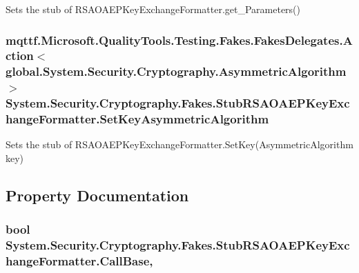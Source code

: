 Sets the stub of R\-S\-A\-O\-A\-E\-P\-Key\-Exchange\-Formatter.\-get\-\_\-\-Parameters()

\hypertarget{class_system_1_1_security_1_1_cryptography_1_1_fakes_1_1_stub_r_s_a_o_a_e_p_key_exchange_formatter_a483d5a9bc9c3feb38e75a051628524e9}{
\subsubsection[{Set\-Key\-Asymmetric\-Algorithm}]{\setlength{\rightskip}{0pt plus 5cm}mqttf.\-Microsoft.\-Quality\-Tools.\-Testing.\-Fakes.\-Fakes\-Delegates.\-Action$<$global.\-System.\-Security.\-Cryptography.\-Asymmetric\-Algorithm$>$ System.\-Security.\-Cryptography.\-Fakes.\-Stub\-R\-S\-A\-O\-A\-E\-P\-Key\-Exchange\-Formatter.\-Set\-Key\-Asymmetric\-Algorithm}}\label{class_system_1_1_security_1_1_cryptography_1_1_fakes_1_1_stub_r_s_a_o_a_e_p_key_exchange_formatter_a483d5a9bc9c3feb38e75a051628524e9}


Sets the stub of R\-S\-A\-O\-A\-E\-P\-Key\-Exchange\-Formatter.\-Set\-Key(\-Asymmetric\-Algorithm key)



\subsection{Property Documentation}
\hypertarget{class_system_1_1_security_1_1_cryptography_1_1_fakes_1_1_stub_r_s_a_o_a_e_p_key_exchange_formatter_a955a2a3725ae7d3e18a77f0bd8e8d8b2}{
\subsubsection[{Call\-Base}]{\setlength{\rightskip}{0pt plus 5cm}bool System.\-Security.\-Cryptography.\-Fakes.\-Stub\-R\-S\-A\-O\-A\-E\-P\-Key\-Exchange\-Formatter.\-Call\-Base\hspace{0.3cm}{\ttfamily [get]}, {\ttfamily [set]}}}\label{class_system_1_1_security_1_1_cryptography_1_1_fakes_1_1_stub_r_s_a_o_a_e_p_key_exchange_formatter_a955a2a3725ae7d3e18a77f0bd8e8d8b2}


